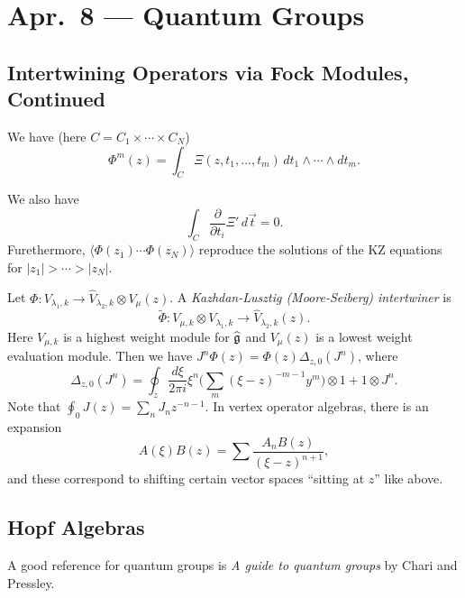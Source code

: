 \chapter{Apr.~8 --- Quantum Groups}

\section{Intertwining Operators via Fock Modules, Continued}

\begin{theorem}
  We have (here $C = C_1 \times \cdots \times C_N$)
  \[
    \Phi^m(z)
    = \int_C \Xi(z, t_1, \dots, t_m)\,
    dt_1 \wedge \cdots \wedge dt_m.
  \]
\end{theorem}

\begin{remark}
  We also have
  \[
    \int_C \frac{\partial}{\partial t_i}
    \Xi'\, d\vec{t} = 0.
  \]
  Furethermore, $\langle \Phi(z_1) \cdots \Phi(z_N) \rangle$
  reproduce the solutions of the KZ
  equations for $|z_1| > \cdots > |z_N|$.
\end{remark}

\begin{remark}
  Let $\Phi : V_{\lambda_1, k} \to \widehat{V}_{\lambda_2, k} \otimes V_\mu(z)$.
  A \emph{Kazhdan-Lusztig (Moore-Seiberg) intertwiner} is
  \[
    \widetilde{\Phi}
    : V_{\mu, k}
    \otimes V_{\lambda_1, k}
    \longrightarrow \widehat{V}_{\lambda_2, k}(z).
  \]
  Here $V_{\mu, k}$ is a highest weight module
  for $\widehat{\mathfrak{g}}$ and $V_\mu(z)$ is a
  lowest weight evaluation module.
  Then we have
  $J^n \Phi(z)
    = \Phi(z) \Delta_{z, 0}(J^n)$, where
  \[
    \Delta_{z, 0}(J^n)
    = \oint_z \frac{d\xi}{2\pi i} \xi^n
    \bigg(
      \sum_m (\xi - z)^{-m - 1} y^m
    \bigg) \otimes 1 + 1 \otimes J^n.
  \]
  Note that $\oint_0 J(z) = \sum_n J_n z^{-n - 1}$.
  In vertex operator algebras,
  there is an expansion
  \[
    A(\xi) B(z)
    = \sum \frac{A_n B(z)}{(\xi - z)^{n + 1}},
  \]
  and these correspond to
  shifting certain vector spaces ``sitting at
  $z$'' like above.
\end{remark}

\section{Hopf Algebras}

\begin{remark}
  A good reference for quantum groups is
  \emph{A guide to quantum groups} by
  Chari and Pressley.
\end{remark}

